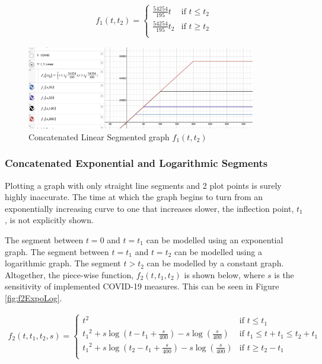 \documentclass[a4paper,titlepage]{article}
\begin{document}
\begin{align}
    f_1(t,t_2)=\begin{cases} 
      \frac{54254}{195}t & \text{if }t\le t_2 \\
      \frac{54254}{195}t_2 & \text{if }t\ge t_2\\
   \end{cases}
\end{align}

\begin{figure}[htbp]
    \centering
    \includegraphics[width=10cm]{f1Linear.png}
    \caption{Concatenated Linear Segmented graph $f_1(t,t_2)$}
    \label{fig:f1Linear}
\end{figure}

\subsubsection{Concatenated Exponential and Logarithmic Segments}

Plotting a graph with only straight line segments and 2 plot points is surely highly inaccurate. The time at which the graph begins to turn from an exponentially increasing curve to one that increases slower, the inflection point, $t_1$, is not explicitly shown.

The segment between $t=0$ and $t=t_1$ can be modelled using an exponential graph. The segment between $t=t_1$ and $t=t_2$ can be modelled using a logarithmic graph. The segment $t>t_2$ can be modelled by a constant graph. Altogether, the piece-wise function, $f_2(t,t_1,t_2)$ is shown below, where $s$ is the sensitivity of implemented COVID-19 measures. This can be seen in Figure \ref{fig:f2ExpoLog}.

\begin{align}
    f_2(t,t_{1},t_{2},s)=\begin{cases}
        t^2 & \text{if }t\le t_{1} \\
        {t_1}^2+s\log\left(t-t_{1}+\frac{s}{400}\right)-s\log\left(\frac{s}{400}\right) & \text{if }t_{1}\le t+t_{1}\le t_{2}+t_{1}\\
        {t_1}^2+s\log\left(t_{2}-t_{1}+\frac{s}{400}\right)-s\log\left(\frac{s}{400}\right) & \text{if }t\ge t_{2}-t_{1}\\
   \end{cases}
\end{align}
\end{document}
